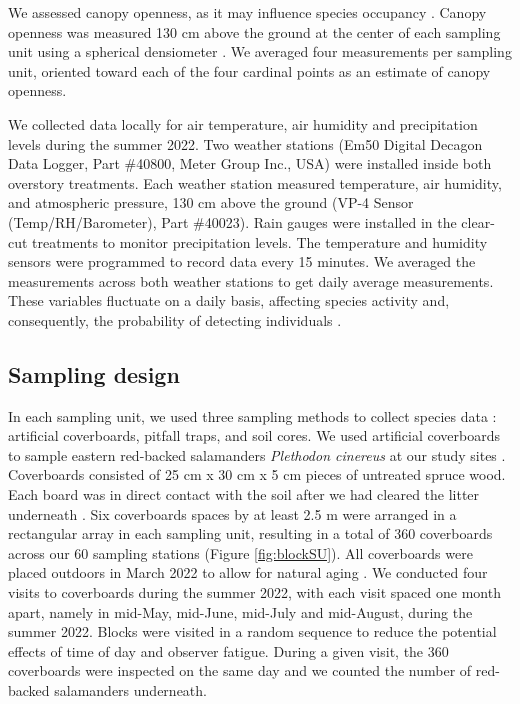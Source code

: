 We assessed canopy openness, as it may influence species occupancy \citep{messereForestFloorDistribution1998,koivulaBorealCarabidbeetleColeoptera2002a,tilghmanMetaanalysisEffectsCanopy2012,henneronForestPlantCommunity2017}.
Canopy openness was measured 130 cm above the ground at the center of each sampling unit using a spherical densiometer \citep{lemmonSphericalDensiometerEstimating1956}. 
We averaged four measurements per sampling unit, oriented toward each of the four cardinal points as an estimate of canopy openness.

We collected data locally for air temperature, air humidity and precipitation levels during the summer 2022. 
Two weather stations (Em50 Digital Decagon Data Logger, Part \#40800, Meter Group Inc., USA) were installed inside both overstory treatments. 
Each weather station measured temperature, air humidity, and atmospheric pressure, 130 cm above the ground (VP-4 Sensor (Temp/RH/Barometer), Part \#40023). 
Rain gauges were installed in the clear-cut treatments to monitor precipitation levels. 
The temperature and humidity sensors were programmed to record data every 15 minutes. 
We averaged the measurements across both weather stations to get daily average measurements. 
These variables fluctuate on a daily basis, affecting species activity and, consequently, the probability of detecting individuals \citep{spotilaRoleTemperatureWater1972,butterfieldCarabidLifeCycle1996,loveiEcologyBehaviorGround1996,odonnellPredictingVariationMicrohabitat2014a}.


\subsection*{Sampling design}
\label{subsec:sampling}

In each sampling unit, we used three sampling methods to collect species data : artificial coverboards, pitfall traps, and soil cores.
We used artificial coverboards to sample eastern red-backed salamanders \textit{Plethodon cinereus} at our study sites \citep{hydeSamplingPlethodontidSalamanders2001,mooreComparisonPopulationEastern2009c,hesedUncoveringSalamanderEcology2012,Mazerolle2021Woodlandsalamander}. 
Coverboards consisted of 25 cm x 30 cm x 5 cm pieces of untreated spruce wood. Each board was in direct contact with the soil after we had cleared the litter underneath \citep{Mazerolle2021Woodlandsalamander}. 
Six coverboards spaces by at least 2.5 m were arranged in a rectangular array in each sampling unit, resulting in a total of 360 coverboards across our 60 sampling stations (Figure \ref{fig:blockSU}). 
All coverboards were placed outdoors in March 2022 to allow for natural aging \citep{hedrickEffectsCoverboardAge2021,Grasser2014Effectscover}. 
We conducted four visits to coverboards during the summer 2022, with each visit spaced one month apart, namely in mid-May, mid-June, mid-July and mid-August, during the summer 2022. 
Blocks were visited in a random sequence to reduce the potential effects of time of day and observer fatigue. 
During a given visit, the 360 coverboards were inspected on the same day and we counted the number of red-backed salamanders underneath.  

